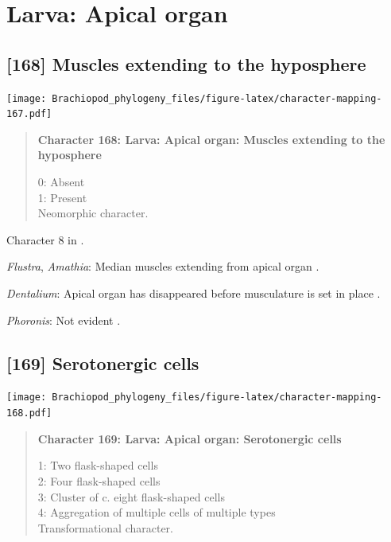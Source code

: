 \documentclass[openany]{book}
\begin{document}
\section{Larva: Apical organ}\label{larva-apical-organ}

\subsection*{{[}168{]} Muscles extending to the
hyposphere}\label{muscles-extending-to-the-hyposphere}

\texttt{[image: Brachiopod\_phylogeny\_files/figure-latex/character-mapping-167.pdf]}

\begin{quote}
\textbf{Character 168: Larva: Apical organ: Muscles extending to the
hyposphere}

0: Absent\\
1: Present\\
Neomorphic character.
\end{quote}

Character 8 in \citet{Vinther2008}.

\hypertarget{Amathia-coding-168}{}
\emph{Flustra}, \emph{Amathia}: Median muscles extending from apical
organ \citep{Gruhl2008}.

\hypertarget{Dentalium-coding-168}{}
\emph{Dentalium}: Apical organ has disappeared before musculature is set
in place \citep{Wanninger2002M}.

\hypertarget{Phoronis-coding-168}{}
\emph{Phoronis}: Not evident \citep[fig. 2C]{Santagata2004}.

\subsection*{{[}169{]} Serotonergic cells}\label{serotonergic-cells}

\texttt{[image: Brachiopod\_phylogeny\_files/figure-latex/character-mapping-168.pdf]}

\begin{quote}
\textbf{Character 169: Larva: Apical organ: Serotonergic cells}

1: Two flask-shaped cells\\
2: Four flask-shaped cells\\
3: Cluster of c. eight flask-shaped cells\\
4: Aggregation of multiple cells of multiple types\\
Transformational character.
\end{quote}
\end{document}

